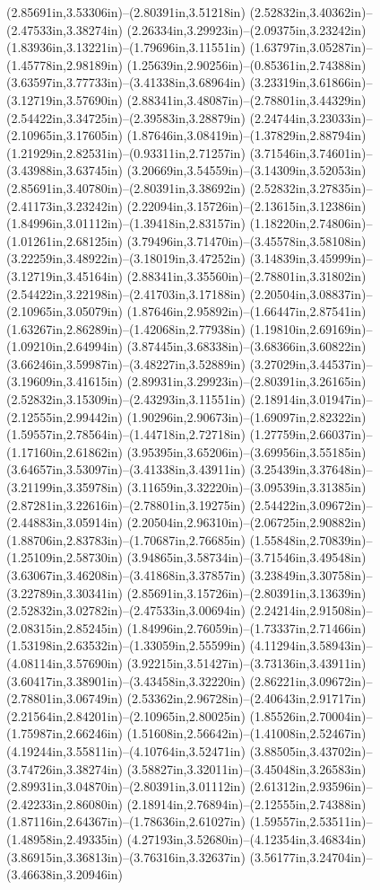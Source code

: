 (2.85691in,3.53306in)--(2.80391in,3.51218in) (2.52832in,3.40362in)--(2.47533in,3.38274in) (2.26334in,3.29923in)--(2.09375in,3.23242in) (1.83936in,3.13221in)--(1.79696in,3.11551in) (1.63797in,3.05287in)--(1.45778in,2.98189in) (1.25639in,2.90256in)--(0.85361in,2.74388in) (3.63597in,3.77733in)--(3.41338in,3.68964in) (3.23319in,3.61866in)--(3.12719in,3.57690in) (2.88341in,3.48087in)--(2.78801in,3.44329in) (2.54422in,3.34725in)--(2.39583in,3.28879in) (2.24744in,3.23033in)--(2.10965in,3.17605in) (1.87646in,3.08419in)--(1.37829in,2.88794in) (1.21929in,2.82531in)--(0.93311in,2.71257in) (3.71546in,3.74601in)--(3.43988in,3.63745in) (3.20669in,3.54559in)--(3.14309in,3.52053in) (2.85691in,3.40780in)--(2.80391in,3.38692in) (2.52832in,3.27835in)--(2.41173in,3.23242in) (2.22094in,3.15726in)--(2.13615in,3.12386in) (1.84996in,3.01112in)--(1.39418in,2.83157in) (1.18220in,2.74806in)--(1.01261in,2.68125in) (3.79496in,3.71470in)--(3.45578in,3.58108in) (3.22259in,3.48922in)--(3.18019in,3.47252in) (3.14839in,3.45999in)--(3.12719in,3.45164in) (2.88341in,3.35560in)--(2.78801in,3.31802in) (2.54422in,3.22198in)--(2.41703in,3.17188in) (2.20504in,3.08837in)--(2.10965in,3.05079in) (1.87646in,2.95892in)--(1.66447in,2.87541in) (1.63267in,2.86289in)--(1.42068in,2.77938in) (1.19810in,2.69169in)--(1.09210in,2.64994in) (3.87445in,3.68338in)--(3.68366in,3.60822in) (3.66246in,3.59987in)--(3.48227in,3.52889in) (3.27029in,3.44537in)--(3.19609in,3.41615in) (2.89931in,3.29923in)--(2.80391in,3.26165in) (2.52832in,3.15309in)--(2.43293in,3.11551in) (2.18914in,3.01947in)--(2.12555in,2.99442in) (1.90296in,2.90673in)--(1.69097in,2.82322in) (1.59557in,2.78564in)--(1.44718in,2.72718in) (1.27759in,2.66037in)--(1.17160in,2.61862in) (3.95395in,3.65206in)--(3.69956in,3.55185in) (3.64657in,3.53097in)--(3.41338in,3.43911in) (3.25439in,3.37648in)--(3.21199in,3.35978in) (3.11659in,3.32220in)--(3.09539in,3.31385in) (2.87281in,3.22616in)--(2.78801in,3.19275in) (2.54422in,3.09672in)--(2.44883in,3.05914in) (2.20504in,2.96310in)--(2.06725in,2.90882in) (1.88706in,2.83783in)--(1.70687in,2.76685in) (1.55848in,2.70839in)--(1.25109in,2.58730in) (3.94865in,3.58734in)--(3.71546in,3.49548in) (3.63067in,3.46208in)--(3.41868in,3.37857in) (3.23849in,3.30758in)--(3.22789in,3.30341in) (2.85691in,3.15726in)--(2.80391in,3.13639in) (2.52832in,3.02782in)--(2.47533in,3.00694in) (2.24214in,2.91508in)--(2.08315in,2.85245in) (1.84996in,2.76059in)--(1.73337in,2.71466in) (1.53198in,2.63532in)--(1.33059in,2.55599in) (4.11294in,3.58943in)--(4.08114in,3.57690in) (3.92215in,3.51427in)--(3.73136in,3.43911in) (3.60417in,3.38901in)--(3.43458in,3.32220in) (2.86221in,3.09672in)--(2.78801in,3.06749in) (2.53362in,2.96728in)--(2.40643in,2.91717in) (2.21564in,2.84201in)--(2.10965in,2.80025in) (1.85526in,2.70004in)--(1.75987in,2.66246in) (1.51608in,2.56642in)--(1.41008in,2.52467in) (4.19244in,3.55811in)--(4.10764in,3.52471in) (3.88505in,3.43702in)--(3.74726in,3.38274in) (3.58827in,3.32011in)--(3.45048in,3.26583in) (2.89931in,3.04870in)--(2.80391in,3.01112in) (2.61312in,2.93596in)--(2.42233in,2.86080in) (2.18914in,2.76894in)--(2.12555in,2.74388in) (1.87116in,2.64367in)--(1.78636in,2.61027in) (1.59557in,2.53511in)--(1.48958in,2.49335in) (4.27193in,3.52680in)--(4.12354in,3.46834in) (3.86915in,3.36813in)--(3.76316in,3.32637in) (3.56177in,3.24704in)--(3.46638in,3.20946in) 
